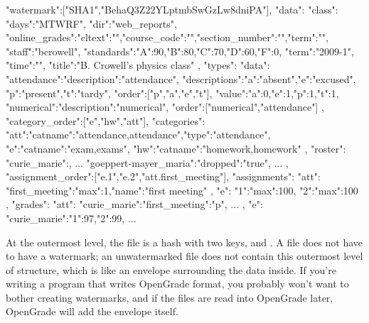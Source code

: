 \documentclass{opengrade_doc}
\begin{document}
\pagebreak

\begin{listing}{1}
{
"watermark":["SHA1","BehaQ3Z22YLptmbSwGzLw8dniPA"],
"data":
  {
    "class":    {
      "days":"MTWRF",
      "dir":"web_reports",
      "online_grades":{"cltext":"","course_code":"","section_number":"","term":""},
      "staff":"bcrowell",
      "standards":{"A":90,"B":80,"C":70,"D":60,"F":0},
      "term":"2009-1",
      "time":"",
      "title":"B. Crowell's physics class"
    },
    "types":    {
      "data":{
        "attendance":{"description":"attendance",
          "descriptions":{"a":"absent","e":"excused",
                   "p":"present","t":"tardy"},
          "order":["p","a","e","t"],
          "value":{"a":0,"e":1,"p":1,"t":1}},
        "numerical":{"description":"numerical"}},
      "order":["numerical","attendance"]
    },
    "category_order":["e","hw","att"],
    "categories":    {
      "att":{"catname":"attendance,attendance","type":"attendance"},
      "e":{"catname":"exam,exams"},
      "hw":{"catname":"homework,homework"}
    },
    "roster":    {
      "curie_marie":{},
      ...
      "goeppert-mayer_maria":{"dropped":"true"},
      ...
    },
    "assignment_order":["e.1","e.2","att.first_meeting"],
    "assignments":    {
      "att":      {
        "first_meeting":{"max":1,"name":"first meeting"}
      },
      "e":      {
        "1":{"max":100},
        "2":{"max":100}
      }
    },
    "grades":    {
      "att":      {
        "curie_marie":{"first_meeting":"p"},
        ...
      },
      "e":      {
        "curie_marie":{"1":97,"2":99},
         ...
      }
    }
  }}
\end{listing}

At the outermost level, the file is a hash with two keys, \verb@watermark@ and \verb@data@. A file does not
have to have a watermark; an unwatermarked file does not contain this outermost level of structure, which is
like an envelope surrounding the data inside. If you're writing a program that writes OpenGrade format,
you probably won't want to bother creating watermarks, and if the files are read into OpenGrade later,
OpenGrade will add the envelope itself. 
\end{document}
